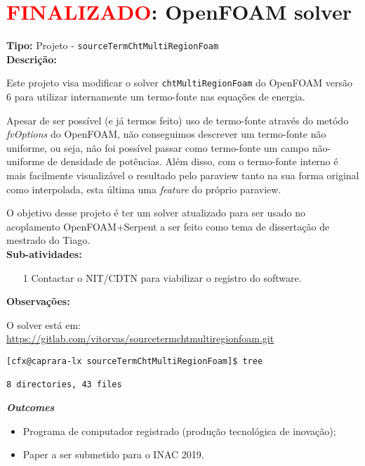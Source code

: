 \chapter{\textcolor{red}{FINALIZADO}: OpenFOAM solver} 

\textbf{Tipo:} Projeto - \texttt{sourceTermChtMultiRegionFoam}\\

\textbf{Descrição:}

Este projeto visa modificar o solver \texttt{chtMultiRegionFoam} do 
OpenFOAM versão 6 para utilizar internamente um termo-fonte nas equações 
de energia.

Apesar de ser possível (e já termos feito) uso de termo-fonte através do 
metódo \textit{fvOptions} do OpenFOAM, não conseguimos descrever um termo-fonte
não uniforme, ou seja, não foi possível passar como termo-fonte um campo não-uniforme
de densidade de potências. Além disso, com o termo-fonte interno é mais facilmente 
visualizável o resultado pelo paraview tanto na sua forma original como interpolada, esta
última uma \textit{feature} do próprio paraview.

O objetivo desse projeto é ter um solver atualizado para ser usado no acoplamento 
OpenFOAM+Serpent a ser feito como tema de dissertação de mestrado 
do Tiago.\\

\textbf{Sub-atividades:}

\begin{itemize}
  \item[1] Contactar o NIT/CDTN para viabilizar o registro do software.
\end{itemize}

\textbf{Observações:}

O solver está em:\\
 \url{https://gitlab.com/vitorvas/sourcetermchtmultiregionfoam.git}\\

\begin{verbatim}
[cfx@caprara-lx sourceTermChtMultiRegionFoam]$ tree

8 directories, 43 files
\end{verbatim}

\textbf{\textit{Outcomes}}

\begin{itemize}
	\item Programa de computador registrado (produção tecnológica de inovação);
	\item Paper a ser submetido para o INAC 2019.
\end{itemize}


